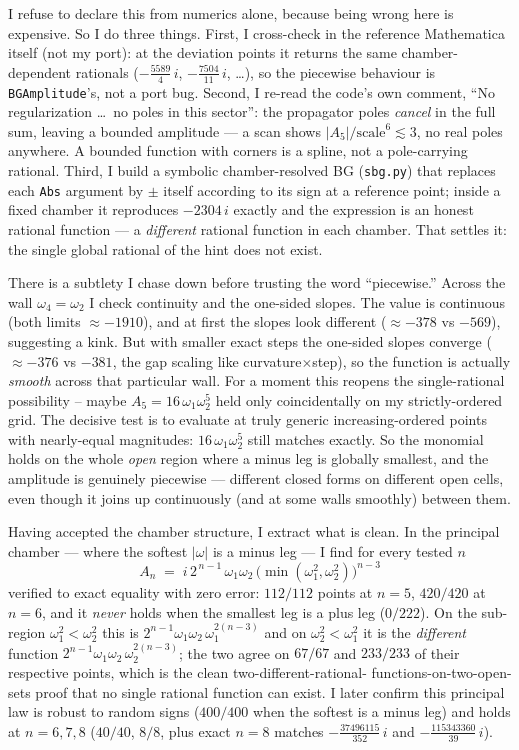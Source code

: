 \documentclass{article}
\begin{document}
I refuse to declare this from numerics alone, because being wrong here is
expensive. So I do three things. First, I cross-check in the reference
Mathematica itself (not my port): at the deviation points it returns the same
chamber-dependent rationals ($-\tfrac{5589}{4}\,i$, $-\tfrac{7504}{11}\,i$, \dots),
so the piecewise behaviour is \texttt{BGAmplitude}'s, not a port bug. Second, I
re-read the code's own comment, ``No regularization \dots\ no poles in this
sector'': the propagator poles \emph{cancel} in the full sum, leaving a bounded
amplitude --- a scan shows $|A_5|/\text{scale}^6\lesssim3$, no real poles
anywhere. A bounded function with corners is a spline, not a pole-carrying
rational. Third, I build a symbolic chamber-resolved BG (\texttt{sbg.py}) that
replaces each \texttt{Abs} argument by $\pm$ itself according to its sign at a
reference point; inside a fixed chamber it reproduces $-2304\,i$ exactly and the
expression is an honest rational function --- a \emph{different} rational function
in each chamber. That settles it: the single global rational of the hint does not
exist.

There is a subtlety I chase down before trusting the word ``piecewise.'' Across
the wall $\omega_4=\omega_2$ I check continuity and the one-sided slopes. The
value is continuous (both limits $\approx-1910$), and at first the slopes look
different ($\approx-378$ vs $-569$), suggesting a kink. But with smaller exact
steps the one-sided slopes converge ($\approx-376$ vs $-381$, the gap scaling like
curvature$\times$step), so the function is actually \emph{smooth} across that
particular wall. For a moment this reopens the single-rational possibility --
maybe $A_5=16\,\omega_1\omega_2^5$ held only coincidentally on my strictly-ordered
grid. The decisive test is to evaluate at truly generic increasing-ordered
points with nearly-equal magnitudes: $16\,\omega_1\omega_2^5$ still matches
exactly. So the monomial holds on the whole \emph{open} region where a minus leg
is globally smallest, and the amplitude is genuinely piecewise --- different
closed forms on different open cells, even though it joins up continuously (and at
some walls smoothly) between them.

Having accepted the chamber structure, I extract what is clean. In the principal
chamber --- where the softest $|\omega|$ is a minus leg --- I find for every
tested $n$
\[
\boxed{\;A_n \;=\; i\,2^{\,n-1}\,\omega_1\omega_2\,
\bigl(\min(\omega_1^2,\omega_2^2)\bigr)^{n-3}\;}
\]
verified to exact equality with zero error: $112/112$ points at $n=5$, $420/420$
at $n=6$, and it \emph{never} holds when the smallest leg is a plus leg ($0/222$).
On the sub-region $\omega_1^2<\omega_2^2$ this is $2^{n-1}\omega_1\omega_2\,
\omega_1^{2(n-3)}$ and on $\omega_2^2<\omega_1^2$ it is the \emph{different}
function $2^{n-1}\omega_1\omega_2\,\omega_2^{2(n-3)}$; the two agree on $67/67$ and
$233/233$ of their respective points, which is the clean two-different-rational-
functions-on-two-open-sets proof that no single rational function can exist. I
later confirm this principal law is robust to random signs ($400/400$ when the
softest is a minus leg) and holds at $n=6,7,8$ ($40/40$, $8/8$, plus exact $n=8$
matches $-\tfrac{37496115}{352}\,i$ and $-\tfrac{115343360}{39}\,i$).
\end{document}
